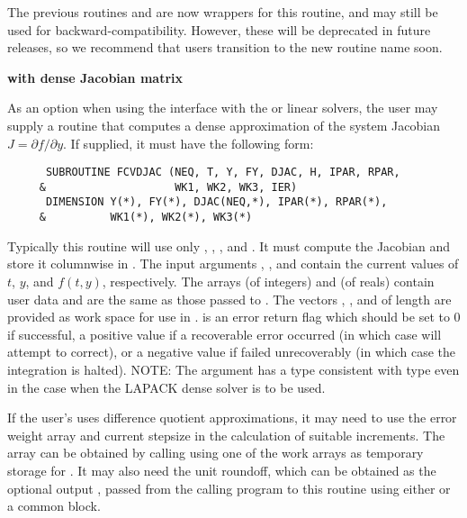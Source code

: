 \begin{Steps}
  The previous routines  and  are now
  wrappers for this routine, and may still be used for
  backward-compatibility.  However, these will be deprecated in future
  releases, so we recommend that users transition to the new routine
  name soon.
  


  {\bf {\cvls} with dense Jacobian matrix}

  As an option when using the {\cvls} interface with the
  {\sunlinsoldense} or {\sunlinsollapdense} linear solvers, the user
  may supply a routine that computes a dense approximation of the
  system Jacobian  $J = \partial f / \partial y$. If supplied, it must
  have the following form: 
\begin{verbatim}
      SUBROUTINE FCVDJAC (NEQ, T, Y, FY, DJAC, H, IPAR, RPAR,
     &                    WK1, WK2, WK3, IER)
      DIMENSION Y(*), FY(*), DJAC(NEQ,*), IPAR(*), RPAR(*),
     &          WK1(*), WK2(*), WK3(*)
\end{verbatim}
  Typically this routine will use only , , , and . 
  It must compute the Jacobian and store it columnwise in .
  The input arguments , , and  contain the current
  values of $t$, $y$, and $f(t,y)$, respectively.
  The arrays  (of integers) and  (of reals) contain user data
  and are the same as those passed to .
  The vectors , , and 
  of length  are provided as work space for use in .
   is an error return flag which should be set to $0$ if successful, 
  a positive value if a recoverable error occurred (in which case {\cvode} will 
  attempt to correct), or a negative value if  failed unrecoverably 
  (in which case the integration is halted).
  NOTE: The argument  has a type consistent with {\CC} type 
  even in the case when the LAPACK dense solver is to be used.

  If the user's  uses difference quotient approximations, it
  may need to use the error weight array  and current stepsize 
  in the calculation of suitable increments.  The array  can be
  obtained by calling  using one of the work arrays as
  temporary storage for .  It may also need the unit roundoff,
  which can be obtained as the optional output , passed from
  the calling program to this routine using either  or a common block.


\end{Steps}

